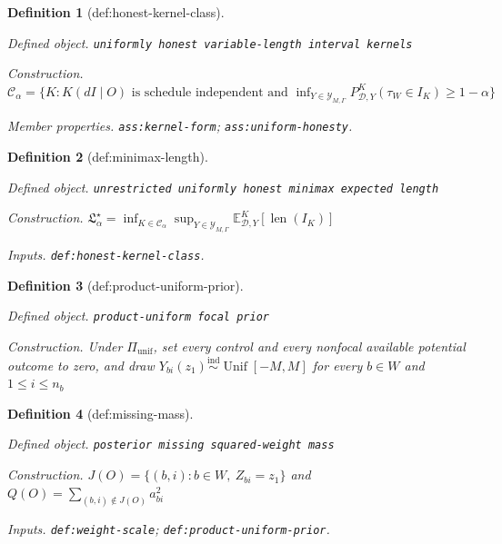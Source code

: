 \documentclass{article}
\newtheorem{definition}{Definition}
\begin{document}
\begin{definition}[def:honest-kernel-class]\label{def:honest-kernel-class}
\par\smallskip\noindent\emph{Defined object.} \texttt{uniformly honest variable-\allowbreak{}length interval kernels}
\par\smallskip\noindent\emph{Construction.} \(\mathcal C_\alpha=\{K:K(dI\mid O)\text{ is schedule independent and }\inf_{Y\in\mathcal Y_{M,\Gamma}}P^K_{\mathcal D,Y}(\tau_W\in I_K)\ge1-\alpha\}\)
\par\smallskip\noindent\emph{Member properties.} \texttt{ass:\allowbreak{}kernel-\allowbreak{}form}; \texttt{ass:\allowbreak{}uniform-\allowbreak{}honesty}.
\end{definition}

\begin{definition}[def:minimax-length]\label{def:minimax-length}
\par\smallskip\noindent\emph{Defined object.} \texttt{unrestricted uniformly honest minimax expected length}
\par\smallskip\noindent\emph{Construction.} \(\mathfrak L_\alpha^\star=\inf_{K\in\mathcal C_\alpha}\sup_{Y\in\mathcal Y_{M,\Gamma}}\mathbb E^K_{\mathcal D,Y}[\operatorname{len}(I_K)]\)
\par\smallskip\noindent\emph{Inputs.} \texttt{def:\allowbreak{}honest-\allowbreak{}kernel-\allowbreak{}class}.
\end{definition}

\begin{definition}[def:product-uniform-prior]\label{def:product-uniform-prior}
\par\smallskip\noindent\emph{Defined object.} \texttt{product-\allowbreak{}uniform focal prior}
\par\smallskip\noindent\emph{Construction.} Under \(\Pi_{\mathrm{unif}}\), set every control and every nonfocal available potential outcome to zero, and draw \(Y_{bi}(z_1)\stackrel{\mathrm{ind}}{\sim}\operatorname{Unif}[-M,M]\) for every \(b\in W\) and \(1\le i\le n_b\)
\end{definition}

\begin{definition}[def:missing-mass]\label{def:missing-mass}
\par\smallskip\noindent\emph{Defined object.} \texttt{posterior missing squared-\allowbreak{}weight mass}
\par\smallskip\noindent\emph{Construction.} \(J(O)=\{(b,i):b\in W,\ Z_{bi}=z_1\}\) and \(Q(O)=\sum_{(b,i)\notin J(O)}a_{bi}^2\)
\par\smallskip\noindent\emph{Inputs.} \texttt{def:\allowbreak{}weight-\allowbreak{}scale}; \texttt{def:\allowbreak{}product-\allowbreak{}uniform-\allowbreak{}prior}.
\end{definition}
\end{document}
